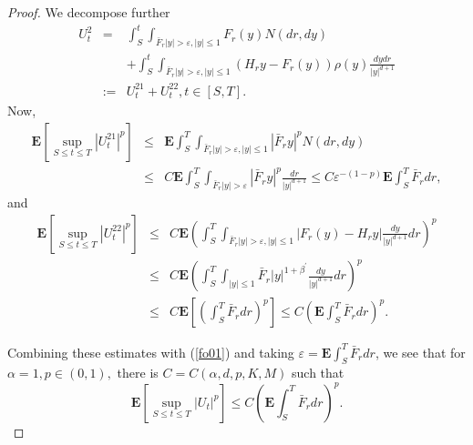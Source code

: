 \documentclass[11pt]{amsart}
\theoremstyle{plain}
\numberwithin{equation}{section}
\begin{document}
\begin{proof}
We decompose further 
\begin{eqnarray*}
U_{t}^{2} &=&\int_{S}^{t}\int_{\bar{F}_{r}\left\vert y\right\vert
>\varepsilon ,\left\vert y\right\vert \leq 1}F_{r}(y)N\left( dr,dy\right) \\
&&+\int_{S}^{t}\int_{\bar{F}_{r}\left\vert y\right\vert >\varepsilon
,\left\vert y\right\vert \leq 1}\left( H_{r}y-F_{r}(y)\right) \rho \left(
y\right) \frac{dydr}{\left\vert y\right\vert ^{d+1}} \\
&:=&U_{t}^{21}+U_{t}^{22},t\in \left[ S,T\right] .
\end{eqnarray*}Now,\begin{eqnarray*}
\mathbf{E}\left[ \sup_{S\leq t\leq T}\left\vert U_{t}^{21}\right\vert ^{p} \right] &\leq &\mathbf{E}\int_{S}^{T}\int_{\bar{F}_{r}\left\vert
y\right\vert >\varepsilon ,\left\vert y\right\vert \leq 1}\left\vert \bar{F}
_{r}y\right\vert ^{p}N\left( dr,dy\right) \\
&\leq &C\mathbf{E}\int_{S}^{T}\int_{\bar{F}_{r}\left\vert y\right\vert
>\varepsilon }\left\vert \bar{F}_{r}y\right\vert ^{p}\frac{dr}{\left\vert
y\right\vert ^{d+1}}\leq C\varepsilon ^{-\left( 1-p\right) }\mathbf{E}
\int_{S}^{T}\bar{F}_{r}dr,
\end{eqnarray*}
and 
\begin{eqnarray*}
\mathbf{E}\left[ \sup_{S\leq t\leq T}\left\vert U_{t}^{22}\right\vert ^{p}\right] &\leq &C\mathbf{E}\left( \int_{S}^{T}\int_{\bar{F}_{r}\left\vert
y\right\vert >\varepsilon ,\left\vert y\right\vert \leq 1}\left\vert
F_{r}(y)-H_{r}y\right\vert \frac{dy}{\left\vert y\right\vert ^{d+1}}dr\right) ^{p} \\
&\leq &C\mathbf{E}\left( \int_{S}^{T}\int_{\left\vert y\right\vert \leq 1}\bar{F}_{r}\left\vert y\right\vert ^{1+\beta ^{\prime }}\frac{dy}{\left\vert
y\right\vert ^{d+1}}dr\right) ^{p} \\
&\leq &C\mathbf{E}\left[ \left( \int_{S}^{T}\bar{F}_{r}dr\right) ^{p}\right]
\leq C\left( \mathbf{E}\int_{S}^{T}\bar{F}_{r}dr\right) ^{p}.
\end{eqnarray*}

Combining these estimates with (\ref{fo01}) and taking $\varepsilon =\mathbf{E}\int_{S}^{T}\bar{F}_{r}dr$, we see that for $\alpha =1,p\in \left(
0,1\right) ,$ there is $C=C\left( \alpha ,d,p,K,M\right) $ such that\begin{equation*}
\mathbf{E}\left[ \sup_{S\leq t\leq T}\left\vert U_{t}\right\vert ^{p}\right]
\leq C\left( \mathbf{E}\int_{S}^{T}\bar{F}_{r}dr\right) ^{p}.
\end{equation*}
\end{proof}
\end{document}
